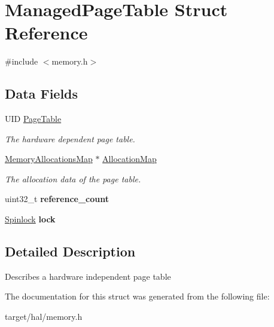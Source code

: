 \hypertarget{structManagedPageTable}{}\section{Managed\+Page\+Table Struct Reference}
\label{structManagedPageTable}


{\ttfamily \#include $<$memory.\+h$>$}

\subsection*{Data Fields}
\begin{DoxyCompactItemize}
\item 
U\+ID \hyperlink{structManagedPageTable_ae948d913dc35bb1db17cbf5d9eef1421}{Page\+Table}\hypertarget{structManagedPageTable_ae948d913dc35bb1db17cbf5d9eef1421}{}\label{structManagedPageTable_ae948d913dc35bb1db17cbf5d9eef1421}

\begin{DoxyCompactList}\small\item\em The hardware dependent page table. \end{DoxyCompactList}\item 
\hyperlink{structMemoryAllocationsMap}{Memory\+Allocations\+Map} $\ast$ \hyperlink{structManagedPageTable_acc79cbb6851fea76cd00fe360759bb96}{Allocation\+Map}\hypertarget{structManagedPageTable_acc79cbb6851fea76cd00fe360759bb96}{}\label{structManagedPageTable_acc79cbb6851fea76cd00fe360759bb96}

\begin{DoxyCompactList}\small\item\em The allocation data of the page table. \end{DoxyCompactList}\item 
uint32\+\_\+t {\bfseries reference\+\_\+count}\hypertarget{structManagedPageTable_a47fb305d0837eda7e24d44d597bc4224}{}\label{structManagedPageTable_a47fb305d0837eda7e24d44d597bc4224}

\item 
\hyperlink{group__sync__hal_ga2b7bd1f01b65ccbfaee98f004746ae8b}{Spinlock} {\bfseries lock}\hypertarget{structManagedPageTable_a275d0aed6f61e025deefedbe1d39b8b1}{}\label{structManagedPageTable_a275d0aed6f61e025deefedbe1d39b8b1}

\end{DoxyCompactItemize}


\subsection{Detailed Description}
Describes a hardware independent page table 

The documentation for this struct was generated from the following file\+:\begin{DoxyCompactItemize}
\item 
target/hal/memory.\+h\end{DoxyCompactItemize}
